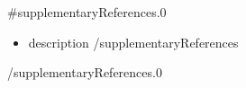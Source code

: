 \documentclass[a4paper]{article}
\begin{document}
{{#supplementaryReferences.0}}
\noindent\begin{minipage}{\textwidth}
\noindent \large  {}
\vspace{\parskip}
\begin{itemize}
{{#supplementaryReferences}}
\selectfont
\item {{description}}
{{/supplementaryReferences}}
\end{itemize}
\end{minipage}
\vspace{\parskip}
\selectfont 
{{/supplementaryReferences.0}}
\end{document}
